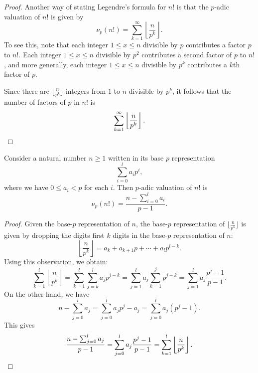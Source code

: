 \begin{proof}
  Another way of stating Legendre's formula for $n!$ is that the $p$-adic valuation of $n!$ is given by
  \begin{equation*}
    \nu_p(n!) = \sum_{k=1}^\infty\left\lfloor\frac{n}{p^k}\right\rfloor.
  \end{equation*}
  To see this, note that each integer $1\leq x \leq n$ divisible by $p$ contributes a factor $p$ to $n!$. Each integer $1\leq x\leq n$ divisible by $p^2$ contributes a second factor of $p$ to $n!$, and more generally, each integer $1\leq x \leq n$ divisible by $p^k$ contributes a $k$th factor of $p$.

  Since there are $\bigl\lfloor\frac{n}{p^k}\bigr\rfloor$ integers from $1$ to $n$ divisible by $p^k$, it follows that the number of factors of $p$ in $n!$ is
  \begin{equation*}
    \sum_{k=1}^\infty\left\lfloor\frac{n}{p^k}\right\rfloor.\qedhere
  \end{equation*}
\end{proof}

\begin{corollary}\label{corollary:de-polignacs-formula}
  Consider a natural number $n\geq 1$ written in its base $p$ representation
  \begin{equation*}
    \sum_{i=0}^{l} a_ip^i,
  \end{equation*}
  where we have $0\leq a_i<p$ for each $i$. Then $p$-adic valuation of $n!$ is
  \begin{equation*}
    \nu_p(n!) = \frac{n-\sum_{i=0}^{l} a_i}{p-1}.
  \end{equation*}
\end{corollary}

\begin{proof}
  Given the base-$p$ representation of $n$, the base-$p$ representation of $\lfloor\frac{n}{p^k}\rfloor$ is given by dropping the digits first $k$ digits in the base-$p$ representation of $n$:
  \begin{equation*}
    \left\lfloor\frac{n}{p^k}\right\rfloor = a_k + a_{k+1}p +\cdots + a_lp^{l-k}.
  \end{equation*}
  Using this observation, we obtain:
  \begin{equation*}
    \sum_{k=1}^{l}\left\lfloor\frac{n}{p^k}\right\rfloor
    = \sum_{k=1}^{l}\sum_{j=k}^{l}a_jp^{j-k}
    = \sum_{j=1}^la_j\sum_{k=1}^{j}p^{j-k}
    = \sum_{j=1}^la_j\frac{p^j-1}{p-1}.
  \end{equation*}
  On the other hand, we have
  \begin{equation*}
    n-\sum_{j=0}^l a_j = \sum_{j=0}^l a_jp^j-a_j = \sum_{j=0}^l a_j(p^j-1).
  \end{equation*}
  This gives
  \begin{equation*}
    \frac{n-\sum_{j=0}^l a_j}{p-1} = \sum_{j=0}^l a_j\frac{p^j-1}{p-1}=
    \sum_{k=1}^{l}\left\lfloor\frac{n}{p^k}\right\rfloor.\qedhere
  \end{equation*}
\end{proof}

